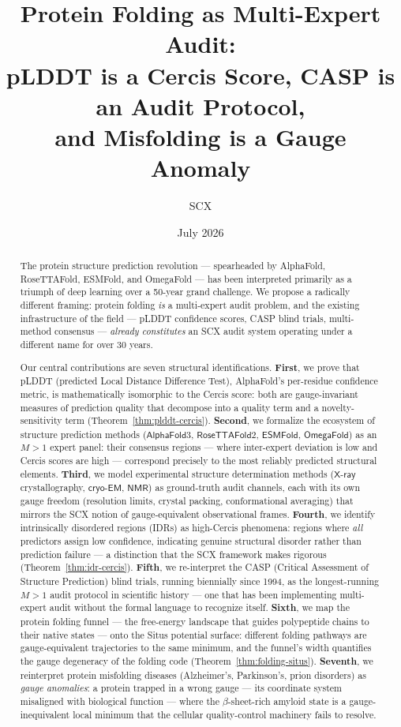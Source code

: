 \documentclass[12pt,a4paper]{article}
\title{\textbf{Protein Folding as Multi-Expert Audit:} \\
       \large pLDDT is a Cercis Score, CASP is an Audit Protocol, \\
       \large and Misfolding is a Gauge Anomaly}
\author{SCX}
\date{July 2026}
\theoremstyle{remark}
\newcommand{\Cercis}{\textsf{Cercis}}
\newcommand{\Situs}{\textsf{Situs}}
\newcommand{\pLDDT}{\textsf{pLDDT}}
\newcommand{\AF}{\textsf{AlphaFold}}
\newcommand{\RF}{\textsf{RoseTTAFold}}
\newcommand{\ESMF}{\textsf{ESMFold}}
\newcommand{\OF}{\textsf{OmegaFold}}
\newcommand{\CASP}{\textsf{CASP}}
\newcommand{\IDR}{\textsf{IDR}}
\newcommand{\cryoEM}{\textsf{cryo-EM}}
\newcommand{\NMRspec}{\textsf{NMR}}
\newcommand{\Xray}{\textsf{X-ray}}
\begin{document}
\maketitle

\begin{abstract}
\noindent
The protein structure prediction revolution — spearheaded by AlphaFold, RoseTTAFold, ESMFold, and OmegaFold — has been interpreted primarily as a triumph of deep learning over a 50-year grand challenge.
We propose a radically different framing: protein folding \emph{is} a multi-expert audit problem, and the existing infrastructure of the field — pLDDT confidence scores, CASP blind trials, multi-method consensus — \emph{already constitutes} an SCX audit system operating under a different name for over 30 years.

Our central contributions are seven structural identifications.
\textbf{First}, we prove that \pLDDT{} (predicted Local Distance Difference Test), AlphaFold's per-residue confidence metric, is mathematically isomorphic to the \Cercis{} score: both are gauge-invariant measures of prediction quality that decompose into a quality term and a novelty-sensitivity term (Theorem~\ref{thm:plddt-cercis}).
\textbf{Second}, we formalize the ecosystem of structure prediction methods ($\AF3$, $\RF2$, $\ESMF$, $\OF$) as an $M > 1$ expert panel: their consensus regions — where inter-expert deviation is low and Cercis scores are high — correspond precisely to the most reliably predicted structural elements.
\textbf{Third}, we model experimental structure determination methods ($\Xray$ crystallography, $\cryoEM$, $\NMRspec$) as ground-truth audit channels, each with its own gauge freedom (resolution limits, crystal packing, conformational averaging) that mirrors the SCX notion of gauge-equivalent observational frames.
\textbf{Fourth}, we identify intrinsically disordered regions (\IDR s) as high-Cercis phenomena: regions where \emph{all} predictors assign low confidence, indicating genuine structural disorder rather than prediction failure — a distinction that the SCX framework makes rigorous (Theorem~\ref{thm:idr-cercis}).
\textbf{Fifth}, we re-interpret the \CASP{} (Critical Assessment of Structure Prediction) blind trials, running biennially since 1994, as the longest-running $M > 1$ audit protocol in scientific history — one that has been implementing multi-expert audit without the formal language to recognize itself.
\textbf{Sixth}, we map the protein folding funnel — the free-energy landscape that guides polypeptide chains to their native states — onto the \Situs{} potential surface: different folding pathways are gauge-equivalent trajectories to the same minimum, and the funnel's width quantifies the gauge degeneracy of the folding code (Theorem~\ref{thm:folding-situs}).
\textbf{Seventh}, we reinterpret protein misfolding diseases (Alzheimer's, Parkinson's, prion disorders) as \emph{gauge anomalies}: a protein trapped in a wrong gauge — its coordinate system misaligned with biological function — where the $\beta$-sheet-rich amyloid state is a gauge-inequivalent local minimum that the cellular quality-control machinery fails to resolve.


\end{abstract}
\end{document}
